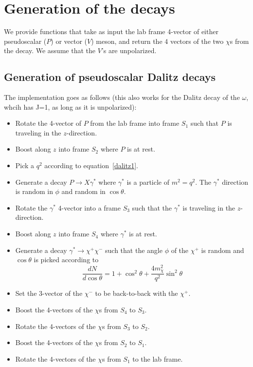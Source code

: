 \documentclass[12pt]{article}
\begin{document}
\clearpage
\section{Generation of the decays}

We provide functions that take as input the lab frame 4-vector of either pseudoscalar
($P$) or vector ($V$) meson, and return the 4 vectors of the two $\chi$s from the decay.
We assume that the $V$'s are unpolarized.


\subsection{Generation of pseudoscalar Dalitz decays}
The implementation goes as follows (this also works for the Dalitz
decay of the $\omega$, whcih has J=1,  as long as it is unpolarized):
\begin{itemize}
\item Rotate the 4-vector of $P$ from the lab frame into frame
  $S_1$ such that $P$ is traveling in the $z$-direction.
\item Boost along $z$ into frame $S_2$ where $P$ is at rest.
\item Pick a $q^2$ according to equation~\ref{dalitz1}.
\item Generate a decay $P \to X \gamma^*$ where $\gamma^*$ is
  a particle of $m^2 = q^2$.  The $\gamma^*$ direction is random
  in $\phi$ and random in $\cos \theta$.
\item Rotate the $\gamma^*$ 4-vector into a frame $S_3$ 
  such that the $\gamma^*$ is traveling in the $z$-direction.
\item Boost along $z$ into frame $S_4$ where $\gamma^*$ is at rest.
\item Generate a decay $\gamma^* \to \chi^+ \chi^-$ such that
  the angle $\phi$ of the $\chi^+$ is random and
  $\cos \theta$ is picked according to~\cite{adlarson}
  \begin{equation}
    \frac{dN}{d \cos \theta} = 1 + \cos^2\theta + \frac{4 m^2_\chi}{q^2} \sin^2\theta
    \label{dalitzAngles}
  \end{equation}
\item  Set the 3-vector of the $\chi^-$ to be back-to-back with the $\chi^+$.
\item Boost the 4-vectors of the $\chi$s from $S_4$ to $S_3$.
\item Rotate the 4-vectors of the $\chi$s from $S_3$ to $S_2$.
\item Boost the 4-vectors of the $\chi$s from $S_2$ to $S_1$.
\item Rotate the 4-vectors of the $\chi$s from $S_1$ to the lab frame.
\end{itemize}
\end{document}
